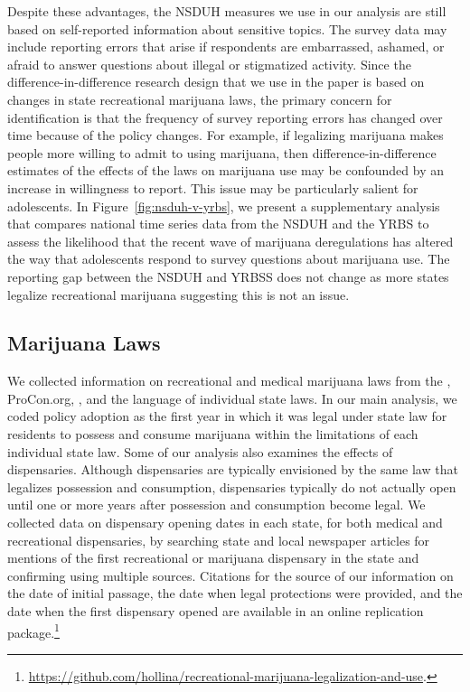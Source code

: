\documentclass[12pt]{article}%
\begin{document}
Despite these advantages, the NSDUH measures we use in our analysis are still based on self-reported information about sensitive topics. The survey data may include reporting errors that arise if respondents are embarrassed, ashamed, or afraid to answer questions about illegal or stigmatized activity. Since the difference-in-difference research design that we use in the paper is based on changes in state recreational marijuana laws, the primary concern for identification is that the frequency of survey reporting errors has changed over time because of the policy changes. For example, if legalizing marijuana makes people more willing to admit to using marijuana, then difference-in-difference estimates of the effects of the laws on marijuana use may be confounded by an increase in willingness to report.  This issue may be particularly salient for adolescents. In Figure~\ref{fig:nsduh-v-yrbs}, we present a supplementary analysis that compares national time series data from the NSDUH and the YRBS to assess the likelihood that the recent wave of marijuana deregulations has altered the way that adolescents respond to survey questions about marijuana use. The reporting gap between the NSDUH and YRBSS does not change as more states legalize recreational marijuana suggesting this is not an issue.


\subsection{Marijuana Laws }\label{sec:data_laws}

We collected information on recreational and medical marijuana laws from the \cite{NationalAllianceforModelStateDrugLaws2017a,NationalAllianceforModelStateDrugLaws2017}, ProCon.org, \cite{Powell2018}, and the language of individual state laws. In our main analysis, we coded policy adoption as the first year in which it was legal under state law for residents to possess and consume marijuana within the limitations of each individual state law. Some of our analysis also examines the effects of dispensaries. Although dispensaries are typically envisioned by the same law that legalizes possession and consumption, dispensaries typically do not actually open until one or more years after possession and consumption become legal. We collected data on dispensary opening dates in each state, for both medical and recreational dispensaries, by searching state and local newspaper articles for mentions of the first recreational or marijuana dispensary in the state and confirming using multiple sources. Citations for the source of our information on  the date of initial passage, the date when legal protections were provided, and the date when the first dispensary opened are available in an online replication package.\footnote{\url{https://github.com/hollina/recreational-marijuana-legalization-and-use}.}
\end{document}

